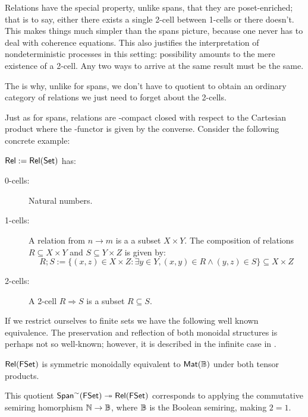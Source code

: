 Relations have the special property, unlike spans, that they are poset-enriched; that is to say, either there exists a single 2-cell between 1-cells or there doesn't. This makes things much simpler than the spans picture, because one never has to deal with coherence equations.  This also justifies the interpretation of nondeterministic processes in this setting: possibility amounts to the mere existence of a 2-cell.  Any two ways to arrive at the same result must be the same.


The is why, unlike for spans,  we don't have to quotient to obtain an ordinary category of relations we just need to forget about the 2-cells.

Just as for spans, relations are \dag-compact closed with respect to the Cartesian product where the \dag-functor is given by the converse.
Consider the following concrete example:
\begin{example}
$\mathsf{Rel}:=\mathsf{Rel}(\mathsf{Set})$ has:
\begin{description}
\item[0-cells:] Natural numbers.
\item[1-cells:] A relation from $n\to m$ is a a subset $X \times Y$.
The composition of relations $R \subseteq X \times Y$  and $S \subseteq Y \times Z$ is given by:
$$
R;S := \{  (x,z) \in X\times Z: \exists y \in Y, (x,y) \in R \wedge (y,z) \in S \} \subseteq X\times Z
$$ 
\item[2-cells:] 
A 2-cell $R\Rightarrow S$ is a subset $R\subseteq S$.
\end{description}
\end{example}
If we restrict ourselves to finite sets we have the following well known equivalence.  The preservation and reflection of both monoidal structures is perhaps not so well-known; however, it is described in the infinite case in \cite[\S 3]{bruni}.
\begin{lemma}
$\mathsf{Rel}(\mathsf{FSet})$ is symmetric monoidally equivalent to $\mathsf{Mat}(\mathbb{B})$ under both tensor products. 
\end{lemma}
This quotient $\mathsf{Span}^{\sim}(\mathsf{FSet})\twoheadrightarrow \mathsf{Rel}(\mathsf{FSet})$ corresponds to applying the commutative semiring homorphism $\mathbb{N}\to \mathbb{B}$, where $\mathbb{B}$ is the Boolean semiring, making $2=1$.


